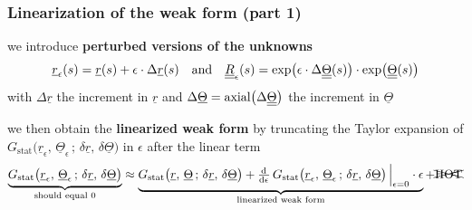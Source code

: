 \begin{frame}
  \frametitle{Linearization of the weak form (part 1)}
  
  we introduce \textbf{perturbed versions of the unknowns}
  \begin{displaymath}
    \underline{r}_{\epsilon}(s) = \underline{r}(s) + \epsilon \cdot \Delta \underline{r}(s)
    \quad \text{and} \quad
    \underline{\underline{R}}_{\epsilon}(s) = \exp \bigl( \epsilon \cdot \Delta \underline{\underline{\Theta}}(s) \bigr) \cdot \exp \bigl( \underline{\underline{\Theta}}(s) \bigr)
  \end{displaymath}
  with $\Delta \underline{r}$ the increment in $\underline{r}$ and $\Delta \underline{\Theta} = \mathrm{axial} \bigl( \Delta \underline{\underline{\Theta}} \bigr)$ the increment in $\underline{\Theta}$
  
  \vspace{1em}
  we then obtain the \textbf{linearized weak form} by truncating the Taylor expansion of $G_{\text{stat}} \bigl( \underline{r}_{\epsilon} , \, \underline{\Theta}_{\epsilon} \, ; \, \delta \underline{r} , \, \delta \underline{\Theta} \bigr)$ in $\epsilon$ after the linear term
  \begin{displaymath}
    \underbrace{
    G_{\text{stat}} \bigl( \underline{r}_{\epsilon} , \, \underline{\Theta}_{\epsilon} \, ; \, \delta \underline{r} , \, \delta \underline{\Theta} \bigr)
    }_{\text{should equal 0}} \approx
    \underbrace{
    G_{\text{stat}} \bigl( \underline{r} , \, \underline{\Theta} \, ; \, \delta \underline{r} , \, \delta \underline{\Theta} \bigr) +
    \od{}{\epsilon} \, G_{\text{stat}} \bigl( \underline{r}_{\epsilon} , \, \underline{\Theta}_{\epsilon} \, ; \, \delta \underline{r} , \, \delta \underline{\Theta} \bigr) \sVert[2]_{\epsilon=0} \cdot \epsilon 
    }_{\text{linearized weak form}}
    + \xcancel{\text{HOT}}
  \end{displaymath}
  
\end{frame}


